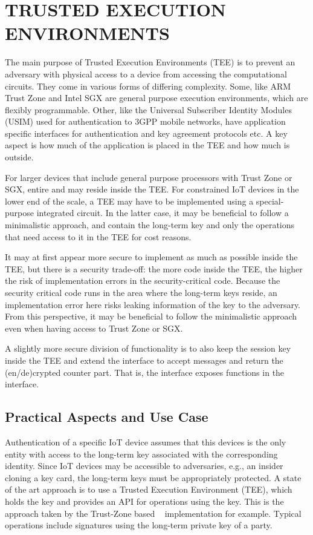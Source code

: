 \documentclass[runningheads]{llncs}
\begin{document}
\section{\uppercase{Trusted Execution Environments}}
\label{sec:TEE}
The main purpose of Trusted Execution Environments (TEE) is to prevent an
adversary with physical access to a device from accessing the computational
circuits.
%
They come in various forms of differing complexity.
%
Some, like ARM Trust Zone and Intel SGX are general purpose execution
environments, which are flexibly programmable.
%
Other, like the Universal Subscriber Identity Modules (USIM) used for
authentication to 3GPP mobile networks, have application specific interfaces for
authentication and key agreement protocols etc.
%
A key aspect is how much of the application is placed in the TEE and how much is
outside.
%

For larger devices that include general purpose processors with Trust Zone or
SGX, entire \mEdhoc{} and \mOscore{} may reside inside the TEE.
%
For constrained IoT devices in the lower end of the scale, a TEE may have to be
implemented using a special-purpose integrated circuit.
%
In the latter case, it may be beneficial to follow a minimalistic approach, and
contain the long-term key and only
the operations that need access to it in the TEE for cost reasons.
%

It may at first appear more secure to implement as much as possible inside the
TEE, but there is a security trade-off: the more code inside the TEE,
the higher the risk of implementation errors in the security-critical code.
%
Because the security critical code runs in the area where the long-term keys
reside, an implementation error here risks leaking information of the key to the
adversary.
%
From this perspective, it may be beneficial to follow the minimalistic approach
even when having access to Trust Zone or SGX.
%

A slightly more secure division of functionality is to also keep the
session key inside
the TEE and extend the interface to accept messages and return the
(en/de)crypted counter part.
%
That is, the interface exposes \mAead{} functions in the interface.
%

\subsection{Practical Aspects and Use Case}
\label{sec:TEE:useCase}
Authentication of a specific IoT device assumes that this devices is the only
entity with access to the long-term key associated with the corresponding
identity.
%
Since IoT devices may be accessible to adversaries, e.g., an insider cloning a
key card, the long-term keys must be appropriately protected.
%
A state of the art approach is to use a Trusted Execution Environment (TEE),
which holds the key and provides an API for operations using the key.
%
This is the approach taken by the
Trust-Zone based \mMuEdhoc{}~\cite{DBLP:conf/codaspy/Hristozov0XFLS21}
implementation for example.
%
Typical operations include signatures using the long-term private key of a
party.
%
\end{document}
